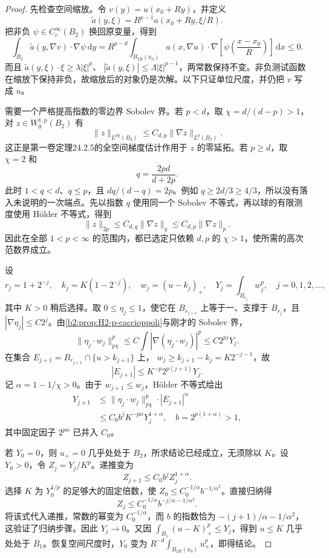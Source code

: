 \begin{proof}
先检查空间缩放。令 \(v(y)=u(x_0+Ry)\)，并定义
\[
 \widetilde a(y,\xi)=R^{p-1}a(x_0+Ry,\xi/R).
\]
把非负 \(\psi\in C_c^\infty(B_2)\) 换回原变量，得到
\[
 \int_{B_2}\widetilde a(y,\nabla v)\cdot\nabla\psi\,\mathrm dy
 =R^{p-d}\int_{B_{2R}(x_0)}
     a(x,\nabla u)\cdot\nabla\!\left[\psi\!\left(\frac{x-x_0}{R}\right)\right]
          \,\mathrm dx\le0.
\]
而且 \(\widetilde a(y,\xi)\cdot\xi\ge\lambda|\xi|^p\)、
\(|\widetilde a(y,\xi)|\le\Lambda|\xi|^{p-1}\)，两常数保持不变。非负测试函数在缩放下保持非负，故缩放后的对象仍是次解。以下只证单位尺度，并仍把 \(v\) 写成 \(u\)。

需要一个严格提高指数的零边界 Sobolev 界。若 \(p<d\)，取 \(\chi=d/(d-p)>1\)，对 \(z\in W_0^{1,p}(B_2)\) 有
\[
 \|z\|_{L^{p\chi}(B_2)}\le C_{d,p}\|\nabla z\|_{L^p(B_2)}.
\]
这正是第一卷定理24.2.5的全空间梯度估计作用于 \(z\) 的零延拓。若 \(p\ge d\)，取 \(\chi=2\) 和
\[
 q=\frac{2pd}{d+2p}.
\]
此时 \(1<q<d\)、\(q\le p\)，且 \(dq/(d-q)=2p\)。例如 \(q\ge2d/3\ge4/3\)，所以没有落入未说明的一次端点。先以指数 \(q\) 使用同一个 Sobolev 不等式，再以球的有限测度使用 Hölder 不等式，得到
\[
 \|z\|_{2p}\le C_{d,q}\|\nabla z\|_q
 \le C_{d,p}\|\nabla z\|_p.
\]
因此在全部 \(1<p<\infty\) 的范围内，都已选定只依赖 \(d,p\) 的 \(\chi>1\)，使所需的高次范数界成立。

设
\[
 r_j=1+2^{-j},\quad k_j=K(1-2^{-j}),\quad
 w_j=(u-k_j)_+,\quad Y_j=\int_{B_{r_j}}w_j^p,
 \quad j=0,1,2,\ldots,
\]
其中 \(K>0\) 稍后选择。取 \(0\le\eta_j\le1\)，使它在 \(B_{r_{j+1}}\) 上等于一、支撑于 \(B_{r_j}\)，且 \(|\nabla\eta_j|\le C2^j\)。由\cref{b2:prop:H2-p-caccioppoli}与刚才的 Sobolev 界，
\[
 \|\eta_j\cdot w_j\|_{p\chi}^p
 \le C\int|\nabla(\eta_j\cdot w_j)|^p
 \le C2^{pj}Y_j.
\]
在集合 \(E_{j+1}=B_{r_{j+1}}\cap\{u>k_{j+1}\}\) 上，
\(w_j\ge k_{j+1}-k_j=K2^{-j-1}\)，故
\[
 |E_{j+1}|\le K^{-p}2^{p(j+1)}Y_j.
\]
记 \(\alpha=1-1/\chi>0\)。由于 \(w_{j+1}\le w_j\)，Hölder 不等式给出
\begin{align*}
 Y_{j+1}
 &\le\|\eta_j\cdot w_j\|_{p\chi}^p\cdot|E_{j+1}|^\alpha\\
 &\le C_0b^jK^{-p\alpha}Y_j^{1+\alpha},
 \quad b=2^{p(1+\alpha)}>1,
\end{align*}
其中固定因子 \(2^{p\alpha}\) 已并入 \(C_0\)。

若 \(Y_0=0\)，则 \(u_+=0\) 几乎处处于 \(B_2\)，所求结论已经成立，无须除以 \(K\)。设 \(Y_0>0\)，令 \(Z_j=Y_j/K^p\)。递推变为
\[
 Z_{j+1}\le C_0b^jZ_j^{1+\alpha}.
\]
选择 \(K\) 为 \(Y_0^{1/p}\) 的足够大的固定倍数，使
\(Z_0\le C_0^{-1/\alpha}b^{-1/\alpha^2}\)。直接归纳得
\[
 Z_j\le C_0^{-1/\alpha}b^{-j/\alpha-1/\alpha^2}.
\]
将该式代入递推，常数的幂变为 \(C_0^{-1/\alpha}\)，而 \(b\) 的指数恰为 \(-(j+1)/\alpha-1/\alpha^2\)，这验证了归纳步骤。因此 \(Y_j\to0\)。又因
\(\int_{B_1}(u-K)_+^p\le Y_j\)，得到 \(u\le K\) 几乎处处于 \(B_1\)。恢复空间尺度时，\(Y_0\) 变为 \(R^{-d}\int_{B_{2R}(x_0)}u_+^p\)，即得结论。
\end{proof}


